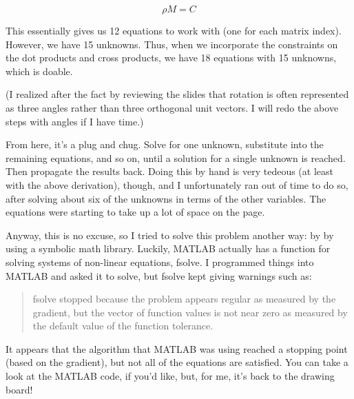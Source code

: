\documentclass{article}
\begin{document}
$$
\rho M = C
$$

This essentially gives us 12 equations to work with (one for each matrix index). 
However, we have 15 
unknowns. Thus, when we incorporate the constraints on the dot products and 
cross products, we have 18 equations with 15 unknowns, which is doable.

(I realized after the fact by reviewing the slides that rotation is often 
represented as three angles rather than three orthogonal unit vectors. I will 
redo the above steps with angles if I have time.)

From here, it's a plug and chug. Solve for one unknown, substitute into the 
remaining equations, and so on, until a solution for a single unknown is 
reached. Then propagate the results back. Doing this by hand is very tedeous (at 
least with the above derivation), though, and I unfortunately ran out of time to 
do so, after solving about six of the unknowns in terms of the other variables. 
The equations were starting to take up a lot of space on the page. 

Anyway, this is no excuse, so I tried to solve this problem another way: by 
by using a symbolic math library. Luckily, MATLAB actually has a function for 
solving systems of non-linear equations, fsolve. I programmed things into 
MATLAB and asked it to solve, but fsolve kept giving warnings such as:

\begin{quote}
fsolve stopped because the problem appears regular as measured by the gradient,
but the vector of function values is not near zero as measured by the
default value of the function tolerance.
\end{quote}

It appears that the algorithm that MATLAB was using reached a stopping point 
(based on the gradient), but not all of the equations are satisfied. You can 
take a look at the MATLAB code, if you'd like, but, for me, it's back to the 
drawing board!
\end{document}
